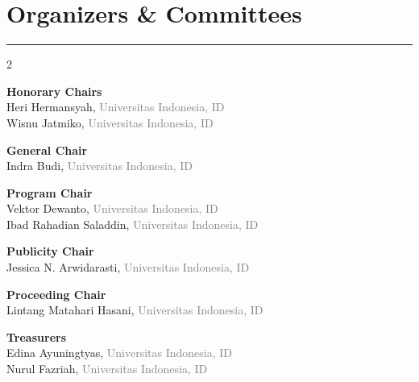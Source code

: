 \documentclass[10pt,a4paper]{article}
\begin{document}
\section{\textbf{Organizers \& Committees}}
\color{conf}\rule{\linewidth}{1pt}\color{black}
\vspace{0.5em}
\begin{multicols}{2}
\raggedcolumns

\begin{minipage}{\linewidth}
\textbf{\color{conf}Honorary Chairs}\\
Heri Hermansyah, \textcolor{gray}{Universitas Indonesia, ID}\\
Wisnu Jatmiko, \textcolor{gray}{Universitas Indonesia, ID}
\end{minipage}
\vspace{0.8em}

\begin{minipage}{\linewidth}
\textbf{\color{conf}General Chair}\\
Indra Budi, \textcolor{gray}{Universitas Indonesia, ID}\\
\end{minipage}
\vspace{0.8em}

\begin{minipage}{\linewidth}
\textbf{\color{conf}Program Chair}\\
Vektor Dewanto, \textcolor{gray}{Universitas Indonesia, ID}\\
Ibad Rahadian Saladdin, \textcolor{gray}{Universitas Indonesia, ID}
\end{minipage}
\vspace{0.8em}

\begin{minipage}{\linewidth}
\textbf{\color{conf}Publicity Chair}\\
Jessica N. Arwidarasti, \textcolor{gray}{Universitas Indonesia, ID}\\
\end{minipage}
\vspace{0.8em}

\begin{minipage}{\linewidth}
\textbf{\color{conf}Proceeding Chair}\\
Lintang Matahari Hasani, \textcolor{gray}{Universitas Indonesia, ID}\\
\end{minipage}
\vspace{0.8em}

\begin{minipage}{\linewidth}
\textbf{\color{conf}Treasurers}\\
Edina Ayuningtyas, \textcolor{gray}{Universitas Indonesia, ID}\\
Nurul Fazriah, \textcolor{gray}{Universitas Indonesia, ID}\\
\end{minipage}
\vspace{0.8em}


\end{multicols}
\end{document}
